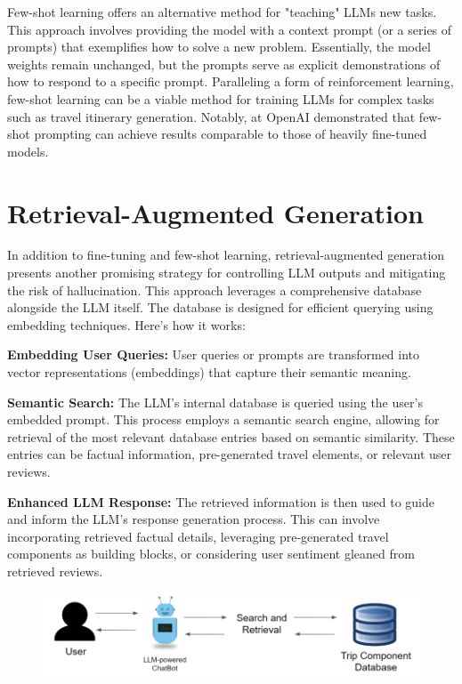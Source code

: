 \documentclass[12pt,a4paper]{report}
\begin{document}
Few-shot learning offers an alternative method for "teaching" LLMs new tasks. This approach involves providing the model with a context prompt (or a series of prompts) that exemplifies how to solve a new problem. Essentially, the model weights remain unchanged, but the prompts serve as explicit demonstrations of how to respond to a specific prompt. Paralleling a form of reinforcement learning, few-shot learning can be a viable method for training LLMs for complex tasks such as travel itinerary generation. Notably, \citet{brown2020language} at OpenAI demonstrated that few-shot prompting can achieve results comparable to those of heavily fine-tuned models.

\section{Retrieval-Augmented Generation}

In addition to fine-tuning and few-shot learning, retrieval-augmented generation presents another promising strategy for controlling LLM outputs and mitigating the risk of hallucination\citep{lewis2021retrievalaugmented}. This approach leverages a comprehensive database alongside the LLM itself. The database is designed for efficient querying using embedding techniques. Here's how it works:

\begin{description}
\item{\textbf{Embedding User Queries:} User queries or prompts are transformed into vector representations (embeddings) that capture their semantic meaning.}
\item{\textbf{Semantic Search:} The LLM's internal database is queried using the user's embedded prompt. This process employs a semantic search engine, allowing for retrieval of the most relevant database entries based on semantic similarity. These entries can be factual information, pre-generated travel elements, or relevant user reviews.}
\item{\textbf{Enhanced LLM Response:} The retrieved information is then used to guide and inform the LLM's response generation process. This can involve incorporating retrieved factual details, leveraging pre-generated travel components as building blocks, or considering user sentiment gleaned from retrieved reviews.}
\end{description}

\begin{figure}[h]
    \centering
    \includegraphics[scale=1.2]{RAGimage}
\end{figure}
\end{document}
